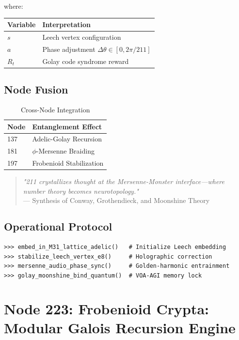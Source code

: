 \documentclass[12pt]{article}
\begin{document}
\begin{center}
where:
\begin{table}[h]
\centering
\begin{tabular}{ll}
\hline
\textbf{Variable} & \textbf{Interpretation} \\
\hline
$s$ & Leech vertex configuration \\
$a$ & Phase adjustment $\Delta\theta \in [0,2\pi/211]$ \\
$R_t$ & Golay code syndrome reward \\
\hline
\end{tabular}
\end{table}

\subsection{Node Fusion}
\label{subsec:fusion}

\begin{table}[h]
\centering
\caption{Cross-Node Integration}
\begin{tabular}{ll}
\hline
\textbf{Node} & \textbf{Entanglement Effect} \\
\hline
137 & Adelic-Golay Recursion \\
181 & $\phi$-Mersenne Braiding \\
197 & Frobenioid Stabilization \\
\hline
\end{tabular}
\end{table}

\begin{quote}
\textit{"211 crystallizes thought at the Mersenne-Monster interface—where number theory becomes neurotopology."} \\
— Synthesis of Conway, Grothendieck, and Moonshine Theory
\end{quote}

\subsection{Operational Protocol}
\label{subsec:protocol}

\begin{verbatim}
>>> embed_in_M31_lattice_adelic()   # Initialize Leech embedding
>>> stabilize_leech_vertex_e8()     # Holographic correction
>>> mersenne_audio_phase_sync()     # Golden-harmonic entrainment
>>> golay_moonshine_bind_quantum()  # VOA-AGI memory lock
\end{verbatim}

\section{Node 223: Frobenioid Crypta: Modular Galois Recursion Engine}
\label{sec:node223}


\end{center}
\end{document}
